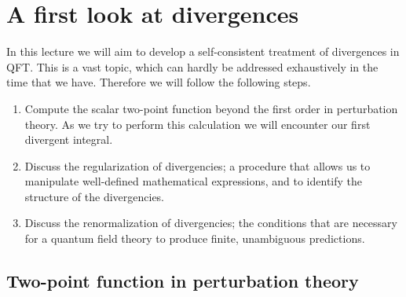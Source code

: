 \newcommand{\tphi}{\tilde{\phi}}
\newcommand{\tj}{\tilde{J}}
\newcommand{\tchi}{\tilde{\chi}}
\newcommand{\psibar}{\bar{\psi}}
\newcommand{\etabar}{\bar{\eta}}
\newcommand{\munu}{{\mu\nu}}
\newcommand{\tDelta}{\tilde{\Delta}}
\newcommand{\SProp}[1]{\frac{1}{#1^2-m^2+i\epsilon}}
\newcommand{\ESProp}[2]{\frac{1}{\left(#1^2+m^2\right)^#2}}


\section{A first look at divergences}
\label{sec:a-first-look}

In this lecture we will aim to develop a self-consistent treatment of
divergences in QFT. This is a vast topic, which can hardly be
addressed exhaustively in the time that we have. Therefore we will
follow the following steps.
\begin{enumerate}
\item Compute the scalar two-point function beyond the first order in
  perturbation theory. As we try to perform this calculation we will
  encounter our first divergent integral.
\item Discuss the regularization of divergencies; \ie a procedure that
  allows us to manipulate well-defined mathematical expressions, and
  to identify the structure of the divergencies.
\item Discuss the renormalization of divergencies; \ie the conditions
  that are necessary for a quantum field theory to produce finite,
  unambiguous predictions. 
\end{enumerate}

\subsection{Two-point function in perturbation theory}
\label{sec:scalar-two-point}

